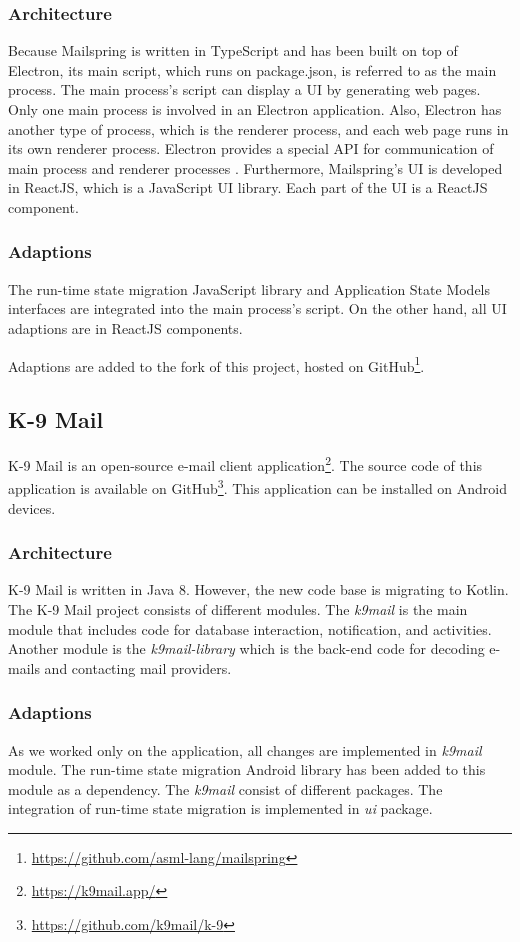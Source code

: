 \subsubsection{Architecture}
Because Mailspring is written in TypeScript and has been built on top of Electron, its main script, which runs on package.json, is referred to as the main process. The main process's script can display a UI by generating web pages. Only one main process is involved in an Electron application. Also, Electron has another type of process, which is the renderer process, and each web page runs in its own renderer process. Electron provides a special API for communication of main process and renderer processes \cite{electron}. Furthermore, Mailspring's UI is developed in ReactJS, which is a JavaScript UI library. Each part of the UI is a ReactJS component.

\subsubsection{Adaptions}
The run-time state migration JavaScript library and Application State Models interfaces are integrated into the main process's script. On the other hand, all UI adaptions are in ReactJS components. 

Adaptions are added to the fork of this project, hosted on GitHub\footnote{\url{https://github.com/asml-lang/mailspring}}. 

\subsection{K-9 Mail}
K-9 Mail is an open-source e-mail client application\footnote{\url{https://k9mail.app/}}. The source code of this application is available on GitHub\footnote{\url{https://github.com/k9mail/k-9}}. This application can be installed on Android devices.

\subsubsection{Architecture}
K-9 Mail is written in Java 8. However, the new code base is migrating to Kotlin. The K-9 Mail project consists of different modules. The \textit{k9mail} is the main module that includes code for database interaction, notification, and activities. Another module is the \textit{k9mail-library} which is the back-end code for decoding e-mails and contacting mail providers. 

\subsubsection{Adaptions}
As we worked only on the application, all changes are implemented in \textit{k9mail} module. The run-time state migration Android library has been added to this module as a dependency. The \textit{k9mail} consist of different packages. The integration of run-time state migration is implemented in \textit{ui} package.

